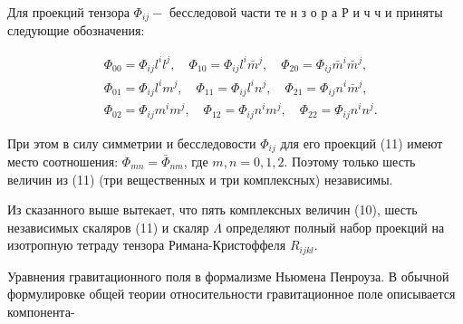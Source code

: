 \documentclass[10pt]{article}
\begin{document}
Для проекций тензора $\Phi_{i j}-$ бесследовой части те н з о р а Р и ч ч и приняты следующие обозначения:



\[

\begin{aligned}

& \Phi_{00}=\Phi_{i j} l^{i} l^{j}, \quad \Phi_{10}=\Phi_{i j} l^{i} \bar{m}^{j}, \quad \Phi_{20}=\Phi_{i j} \bar{m}^{i} \bar{m}^{j}, \\

& \Phi_{01}=\Phi_{i j} l^{i} m^{j}, \quad \Phi_{11}=\Phi_{i j} l^{i} n^{j}, \quad \Phi_{21}=\Phi_{i j} n^{i} \bar{m}^{j}, \\

& \Phi_{02}=\Phi_{i j} m^{i} m^{j}, \quad \Phi_{12}=\Phi_{i j} n^{i} m^{j}, \quad \Phi_{22}=\Phi_{i j} n^{i} n^{j} .

\end{aligned}

\]



При этом в силу симметрии и бесследовости $\Phi_{i j}$ для его проекций (11) имеют место соотношения: $\Phi_{m n}=\bar{\Phi}_{n m}$, где $m, n=0,1,2$. Поэтому только шесть величин из (11) (три вещественных и три комплексных) независимы.



Из сказанного выше вытекает, что пять комплексных величин (10), шесть независимых скаляров (11) и скаляр $\Lambda$ определяют полный набор проекций на изотропную тетраду тензора Римана-Кристоффеля $R_{i j k l}$.



Уравнения гравитационного поля в формализме Ньюмена Пенроуза. В обычной формулировке общей теории относительности гравитационное поле описывается компонента-
\end{document}

